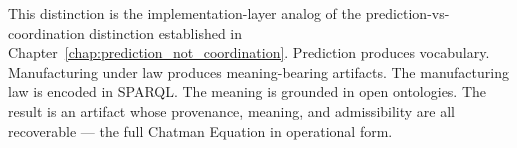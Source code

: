 This distinction is the implementation-layer analog of the prediction-vs-coordination distinction established in Chapter~\ref{chap:prediction_not_coordination}. Prediction produces vocabulary. Manufacturing under law produces meaning-bearing artifacts. The manufacturing law is encoded in SPARQL. The meaning is grounded in open ontologies. The result is an artifact whose provenance, meaning, and admissibility are all recoverable --- the full Chatman Equation in operational form.

